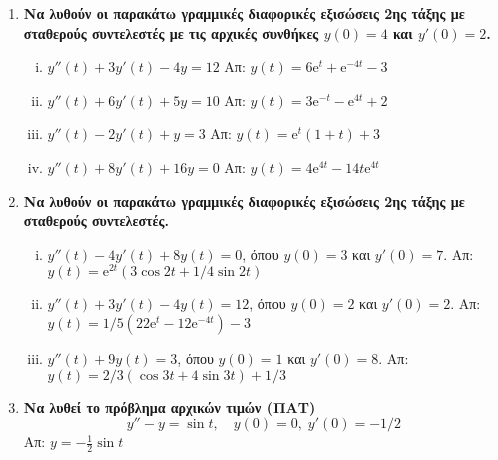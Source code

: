 \documentclass[a4paper,table]{report}
\begin{document}
\begin{enumerate}
  \item {\bfseries Να λυθούν οι παρακάτω γραμμικές διαφορικές εξισώσεις 2ης τάξης 
    με σταθερούς συντελεστές με τις αρχικές συνθήκες $ y(0)=4 $ και $ y'(0)=2 $.}
    \begin{enumerate}[i)]
      \item  $y''(t)+3y'(t) -4y=12$ 
        \hfill Απ: $ y(t)=6 \mathrm{e}^{t} + \mathrm{e}^{-4t} -3 $ 
      \item  $y''(t)+6y'(t) +5y=10$ 
        \hfill Απ: $ y(t) = 3 \mathrm{e}^{-t} - \mathrm{e}^{4t} +2  $ 
      \item  $y''(t)-2y'(t) +y=3$ \hfill Απ: $ y(t)= \mathrm{e}^{t} (1+t)+3 $  
      \item  $y''(t)+8y'(t) +16y=0$ 
        \hfill Απ: $ y(t)=4 \mathrm{e}^{4t} - 14 t\mathrm{e}^{4t} $
    \end{enumerate}

  \item {\bfseries Να λυθούν οι παρακάτω γραμμικές διαφορικές εξισώσεις 2ης τάξης 
    με σταθερούς συντελεστές.}
    \begin{enumerate}[i)]
      \item $ y''(t)-4y'(t)+8y(t)=0 $, όπου $ y(0)=3 $ και $ y'(0)=7 $.
        \hfill Απ: $ y(t)= \mathrm{e}^{2t} (3 \cos{2t} + 1/4 \sin{2t}) $  
      \item $ y''(t)+3y'(t)-4y(t)=12 $, όπου $ y(0)=2 $ και $ y'(0)=2 $.
        \hfill Απ: $ y(t)= 1/5(22\mathrm{e}^{t}-12 \mathrm{e}^{-4t} )-3 $  
      \item $ y''(t)+9y(t)=3 $, όπου $ y(0)=1 $ και $ y'(0)=8 $.
        \hfill Απ: $ y(t)= 2/3(\cos{3t} + 4 \sin{3t})+1/3 $  
    \end{enumerate}

  \item {\bfseries Να λυθεί το πρόβλημα αρχικών τιμών (ΠΑΤ)}
    \[
      y''-y=\sin t, \quad y(0)=0,\; y'(0)=-{1}/{2}
    \]
    \hfill Απ: $y= -\frac{1}{2}\sin t$

\end{enumerate}
\end{document}
